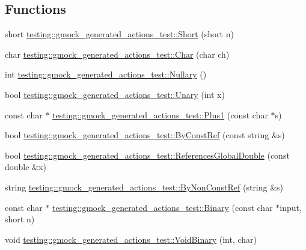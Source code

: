 \subsection*{Functions}
\begin{DoxyCompactItemize}
\item 
short \hyperlink{namespacetesting_1_1gmock__generated__actions__test_a7c442b3594b6717b8d499781a82170b2}{testing\+::gmock\+\_\+generated\+\_\+actions\+\_\+test\+::\+Short} (short n)
\item 
char \hyperlink{namespacetesting_1_1gmock__generated__actions__test_aa07e216a4c9d492fb7e7c8fde949bc8f}{testing\+::gmock\+\_\+generated\+\_\+actions\+\_\+test\+::\+Char} (char ch)
\item 
int \hyperlink{namespacetesting_1_1gmock__generated__actions__test_acb3d926ebbe88529c38d95f5e61573ef}{testing\+::gmock\+\_\+generated\+\_\+actions\+\_\+test\+::\+Nullary} ()
\item 
bool \hyperlink{namespacetesting_1_1gmock__generated__actions__test_a61f0e6c3f2c07079299f1d6e1667ab92}{testing\+::gmock\+\_\+generated\+\_\+actions\+\_\+test\+::\+Unary} (int x)
\item 
const char $\ast$ \hyperlink{namespacetesting_1_1gmock__generated__actions__test_a75e901c6d28c591c53a54320a294da55}{testing\+::gmock\+\_\+generated\+\_\+actions\+\_\+test\+::\+Plus1} (const char $\ast$s)
\item 
bool \hyperlink{namespacetesting_1_1gmock__generated__actions__test_a5886409b3306d3ff2fe548f9747f1de8}{testing\+::gmock\+\_\+generated\+\_\+actions\+\_\+test\+::\+By\+Const\+Ref} (const string \&s)
\item 
bool \hyperlink{namespacetesting_1_1gmock__generated__actions__test_a3e552b41de08f0516f4b0e32fed68a61}{testing\+::gmock\+\_\+generated\+\_\+actions\+\_\+test\+::\+References\+Global\+Double} (const double \&x)
\item 
string \hyperlink{namespacetesting_1_1gmock__generated__actions__test_a2d12f232cedb11c5955db0ebb1429eb2}{testing\+::gmock\+\_\+generated\+\_\+actions\+\_\+test\+::\+By\+Non\+Const\+Ref} (string \&s)
\item 
const char $\ast$ \hyperlink{namespacetesting_1_1gmock__generated__actions__test_a3ec2020ddbfa6f2e993e0f88be1e691f}{testing\+::gmock\+\_\+generated\+\_\+actions\+\_\+test\+::\+Binary} (const char $\ast$input, short n)
\item 
void \hyperlink{namespacetesting_1_1gmock__generated__actions__test_af957302d6c2b4dacd31385f2a34b529f}{testing\+::gmock\+\_\+generated\+\_\+actions\+\_\+test\+::\+Void\+Binary} (int, char)

\end{DoxyCompactItemize}
